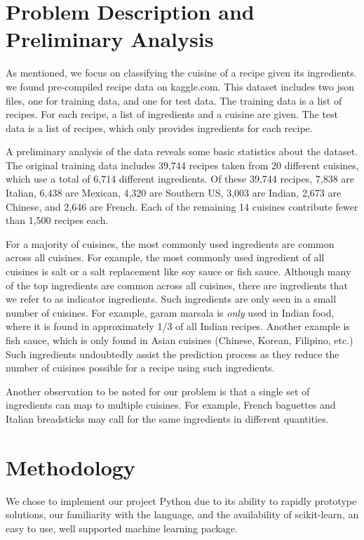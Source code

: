 \documentclass[11pt]{article}
\begin{document}
\section{Problem Description and Preliminary Analysis}
As mentioned, we focus on classifying the cuisine of a recipe given
its ingredients.  we found pre-compiled recipe data on kaggle.com.
This dataset includes two json files, one for training data, and one
for test data.  The training data is a list of recipes.  For each
recipe, a list of ingredients and a cuisine are given.  The test data
is a list of recipes, which only provides ingredients for each
recipe. 

A preliminary analysis of the data reveals some basic statistics about
the dataset.  The original training data includes 39,744 recipes taken
from 20 different cuisines, which use a total of 6,714 different
ingredients.  Of these 39,744 recipes, 7,838 are Italian, 6,438 are
Mexican, 4,320 are Southern US, 3,003 are Indian, 2,673 are Chinese,
and 2,646 are French.  Each of the remaining 14 cuisines contribute
fewer than 1,500 recipes each.

For a majority of cuisines, the most commonly used ingredients are
common across all cuisines.  For example, the most commonly used
ingredient of all cuisines is salt or a salt replacement like soy
sauce or fish sauce.  Although many of the top ingredients are common
across all cuisines, there are ingredients that we refer to as
indicator ingredients.  Such ingredients are only seen in a small
number of cuisines.  For example, garam marsala is \emph{only} used in
Indian food, where it is found in approximately 1/3 of all Indian
recipes.  Another example is fish sauce, which is only found in Asian
cuisines (Chinese, Korean, Filipino, etc.) Such ingredients
undoubtedly assist the prediction process as they reduce 
the number of cuisines possible for a recipe using such ingredients.  

Another observation to be noted for our problem is that a single set of
ingredients can map to multiple cuisines.  For example, French
baguettes and Italian breadsticks may call for the same ingredients in
different quantities.


\section{Methodology}
We chose to implement our project Python due to its ability to rapidly
prototype solutions, our familiarity with the language, and the
availability of scikit-learn, an easy to use, well supported machine
learning package.  
\end{document}
